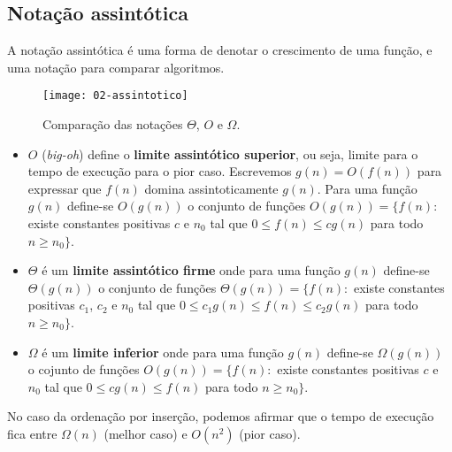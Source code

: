 \subsection{Notação assintótica}

A notação assintótica é uma forma de denotar o crescimento de uma função,
e uma notação para comparar algoritmos.
%
\begin{figure}[ht]
\centering
\texttt{[image: 02-assintotico]}
\caption{Comparação das notações $\Theta$, $O$ e $\Omega$.}
\label{aula02:fig:assintotico}
\end{figure}

\begin{itemize}
\item $O$ (\emph{big-oh}) define o {\bf limite assintótico superior}, ou seja, 
limite para o tempo de execução para o pior caso. Escrevemos $g(n) = O(f(n))$ para
expressar que $f(n)$ domina assintoticamente $g(n)$. Para
uma função $g(n)$ define-se $O(g(n))$ o conjunto de funções 
$O(g(n)) = \{f(n):$ existe constantes positivas $c$ e $n_0$ tal que $0 \leq f(n) \leq c g(n)$ 
para todo $n \geq n_0\}$.

\item $\Theta$ é um {\bf limite assintótico firme} onde 
para uma função $g(n)$ define-se $\Theta(g(n))$ o conjunto de funções 
$\Theta(g(n)) = \{f(n):$ existe constantes positivas $c_1$, $c_2$ e $n_0$ tal que 
$0 \leq c_1 g(n) \leq f(n) \leq c_2 g(n)$ 
para todo $n \geq n_0\}$.

\item $\Omega$ é um {\bf limite inferior} onde para uma função $g(n)$ 
define-se $\Omega(g(n))$ o cojunto de funções
$O(g(n)) = \{f(n):$ existe constantes positivas $c$ e $n_0$ tal que $0 \leq c g(n) \leq f(n)$ 
para todo $n \geq n_0\}$.

\end{itemize}

No caso da ordenação por inserção, podemos afirmar que o tempo de execução fica entre
$\Omega(n)$ (melhor caso) e $O(n^2)$ (pior caso).


